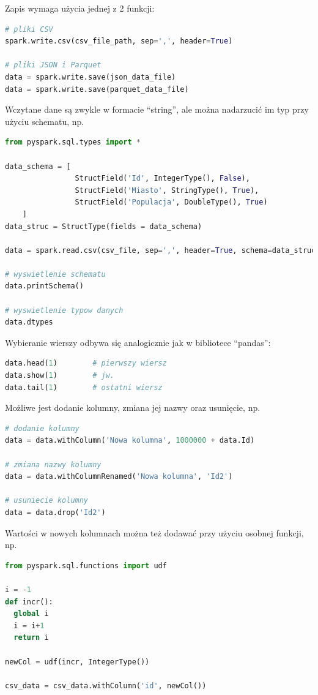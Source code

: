 \documentclass[11pt]{report}
\begin{document}
Zapis wymaga użycia jednej z 2 funkcji:

\begin{lstlisting}[language=Python]
# pliki CSV
spark.write.csv(csv_file_path, sep=',', header=True)

# pliki JSON i Parquet
data = spark.write.save(json_data_file)
data = spark.write.save(parquet_data_file)
\end{lstlisting}

Wczytane dane są zwykle w formacie \enquote{string}, ale można nadarzucić im typ przy użyciu schematu, np.

\begin{lstlisting}[language=Python]
from pyspark.sql.types import *

data_schema = [
                StructField('Id', IntegerType(), False), 
                StructField('Miasto', StringType(), True), 
                StructField('Populacja', DoubleType(), True)
    ]
data_struc = StructType(fields = data_schema)

data = spark.read.csv(csv_file, sep=',', header=True, schema=data_struc)

# wyswietlenie schematu
data.printSchema()

# wyswietlenie typow danych
data.dtypes
\end{lstlisting}

Wybieranie wierszy odbywa się analogicznie jak w bibliotece \enquote{pandas}:

\begin{lstlisting}[language=Python]
data.head(1)        # pierwszy wiersz
data.show(1)        # jw.
data.tail(1)        # ostatni wiersz
\end{lstlisting}

Możliwe jest dodanie kolumny, zmiana jej nazwy oraz usunięcie, np.

\begin{lstlisting}[language=Python]
# dodanie kolumny
data = data.withColumn('Nowa kolumna', 1000000 + data.Id)

# zmiana nazwy kolumny
data = data.withColumnRenamed('Nowa kolumna', 'Id2')

# usuniecie kolumny
data = data.drop('Id2')
\end{lstlisting}

Wartości w nowych kolumnach można też dodawać przy użyciu osobnej funkcji, np.

\begin{lstlisting}[language=Python]
from pyspark.sql.functions import udf

i = -1
def incr():
  global i
  i = i+1
  return i

newCol = udf(incr, IntegerType())

csv_data = csv_data.withColumn('id', newCol())
\end{lstlisting}
\end{document}
